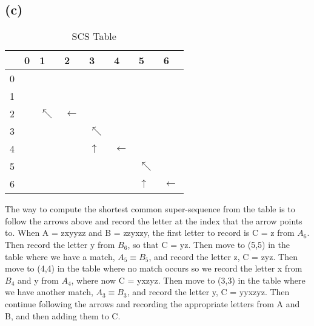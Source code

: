 \documentclass[12pt]{article}
\begin{document}
\subsection*{(c)}
\begin{table}[H]
\centering
\caption{SCS Table}
\label{my-label}
\begin{tabular}{l|lllllll}
  & 0 & 1 & 2 & 3 & 4 & 5 & 6 \\ \hline
0 &   &   &   &   &   &   &   \\
1 &   &  &   &   &   &   &   \\
2 &   &  {$\nwarrow$} &  {$\leftarrow$} &   &   &   &   \\
3 &   &   &   &  {$\nwarrow$} &   &   &   \\
4 &   &   &   & {$\uparrow$}  & {$\leftarrow$}  &   &   \\
5 &   &   &   &   &  & {$\nwarrow$}  &   \\
6 &   &   &   &   &   & {$\uparrow$}  &  {$\leftarrow$}
\end{tabular}
\end{table}
The way to compute the shortest common super-sequence from the table is to follow the arrows above and record the letter at the index that the arrow points to. When A = zxyyzz and B = zzyxzy, the first letter to record is C = z from {$A_6$}. Then record the letter y from {$B_6$}, so that C = yz. Then move to (5,5) in the table where we have a match, {$A_5 \equiv B_5$}, and record the letter z, C = zyz. Then move to (4,4) in the table where no match occurs so we record the letter x from {$B_4$} and y from {$A_4$}, where now C = yxzyz. Then move to (3,3) in the table where we have another match, {$A_3 \equiv B_3$}, and record the letter y, C = yyxzyz. Then continue following the arrows and recording the appropriate letters from A and B, and then adding them to C.
\end{document}

